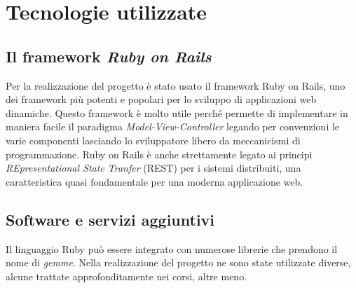 \section{Tecnologie utilizzate}

\subsection{Il framework \textit{Ruby on Rails}}
Per la realizzazione del progetto è stato usato il framework Ruby on Rails\cite{RoR}\cite{docror}, uno dei framework più potenti e popolari per lo sviluppo di
applicazioni web dinamiche.
Questo framework è molto utile perché permette di implementare in maniera facile il paradigma \textit{Model-View-Controller} legando per convenzioni le varie componenti lasciando lo sviluppatore libero da meccanicismi di programmazione. Ruby on Rails è anche strettamente legato ai principi \textit{REpresentational State Tranfer} (REST) per i sistemi distribuiti, una caratteristica quasi fondamentale per una moderna applicazione web.

\subsection{Software e servizi aggiuntivi}
Il linguaggio Ruby può essere integrato con numerose librerie che prendono il nome di \textit{gemme}. Nella realizzazione del progetto ne sono state utilizzate diverse, alcune trattate approfonditamente nei corsi, altre meno.

